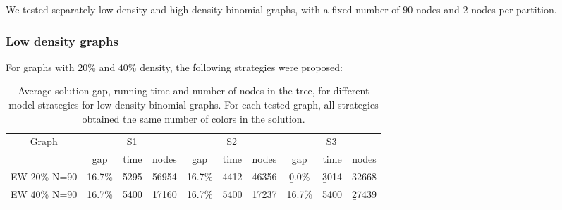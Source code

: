 We tested separately low-density and high-density binomial graphs, with a fixed number of $90$ nodes and $2$ nodes per partition. 

\subsubsection*{Low density graphs}

For graphs with $20\%$ and $40\%$ density, the following strategies were proposed:

\begin{itemize}
\end{itemize}

\begin{table}
\begin{tabular}{|c|ccc|ccc|ccc|}
\hline
\multicolumn{1}{|c|}{Graph} & \multicolumn{3}{|c|}{S1} & \multicolumn{3}{|c|}{S2} & \multicolumn{3}{|c|}{S3}
\\
 & gap & time & nodes & gap & time & nodes & gap & time & nodes 
\\
\hline
EW 20\% N=90 & 16.7\% & 5295 & 56954 & 16.7\% & 4412 & 46356 & \b{0.0\%} & \b{3014} & 32668
\\
EW 40\% N=90 & 16.7\% & 5400 & 17160 & 16.7\% & 5400 & 17237 & 16.7\% & 5400 & \b{27439}
\\
\hline 
 \end{tabular}
 \caption{Average solution gap, running time and number of nodes in the tree, for different model strategies for low density binomial graphs. For each tested graph, all strategies obtained the same number of colors in the solution.}
\label{table:bnc:modellow}
\end{table}

